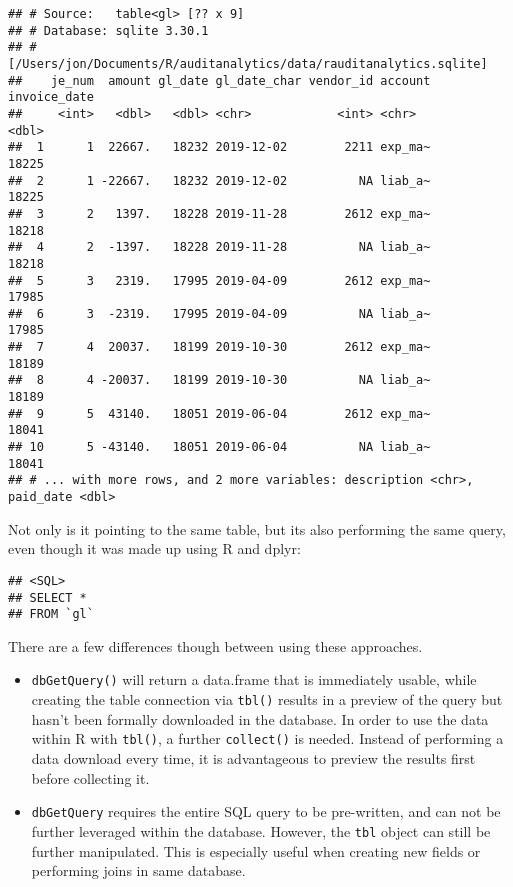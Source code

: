 \documentclass[
]{book}
\newenvironment{Shaded}{\begin{snugshade}}{\end{snugshade}}
\newcommand{\KeywordTok}[1]{\textcolor[rgb]{0.13,0.29,0.53}{\textbf{#1}}}
\newcommand{\NormalTok}[1]{#1}
\newcommand{\OperatorTok}[1]{\textcolor[rgb]{0.81,0.36,0.00}{\textbf{#1}}}
\newcommand{\StringTok}[1]{\textcolor[rgb]{0.31,0.60,0.02}{#1}}
\begin{document}
\begin{verbatim}
## # Source:   table<gl> [?? x 9]
## # Database: sqlite 3.30.1
## #   [/Users/jon/Documents/R/auditanalytics/data/rauditanalytics.sqlite]
##    je_num  amount gl_date gl_date_char vendor_id account invoice_date
##     <int>   <dbl>   <dbl> <chr>            <int> <chr>          <dbl>
##  1      1  22667.   18232 2019-12-02        2211 exp_ma~        18225
##  2      1 -22667.   18232 2019-12-02          NA liab_a~        18225
##  3      2   1397.   18228 2019-11-28        2612 exp_ma~        18218
##  4      2  -1397.   18228 2019-11-28          NA liab_a~        18218
##  5      3   2319.   17995 2019-04-09        2612 exp_ma~        17985
##  6      3  -2319.   17995 2019-04-09          NA liab_a~        17985
##  7      4  20037.   18199 2019-10-30        2612 exp_ma~        18189
##  8      4 -20037.   18199 2019-10-30          NA liab_a~        18189
##  9      5  43140.   18051 2019-06-04        2612 exp_ma~        18041
## 10      5 -43140.   18051 2019-06-04          NA liab_a~        18041
## # ... with more rows, and 2 more variables: description <chr>, paid_date <dbl>
\end{verbatim}

Not only is it pointing to the same table, but its also performing the same query, even though it was made up using R and dplyr:

\begin{Shaded}
\end{Shaded}

\begin{verbatim}
## <SQL>
## SELECT *
## FROM `gl`
\end{verbatim}

There are a few differences though between using these approaches.

\begin{itemize}
\item
  \texttt{dbGetQuery()} will return a data.frame that is immediately usable, while creating the table connection via \texttt{tbl()} results in a preview of the query but hasn't been formally downloaded in the database. In order to use the data within R with \texttt{tbl()}, a further \texttt{collect()} is needed. Instead of performing a data download every time, it is advantageous to preview the results first before collecting it.
\item
  \texttt{dbGetQuery} requires the entire SQL query to be pre-written, and can not be further leveraged within the database. However, the \texttt{tbl} object can still be further manipulated. This is especially useful when creating new fields or performing joins in same database.
\end{itemize}
\end{document}
